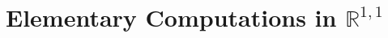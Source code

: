 \documentclass[12pt]{amsart}
\newcommand{\bC}{\mathbb{C}}
\newcommand{\bR}{\mathbb{R}}
\begin{document}


\section{Elementary Computations in ${\bR}^{1,1}$}\label{compute}
\end{document}
